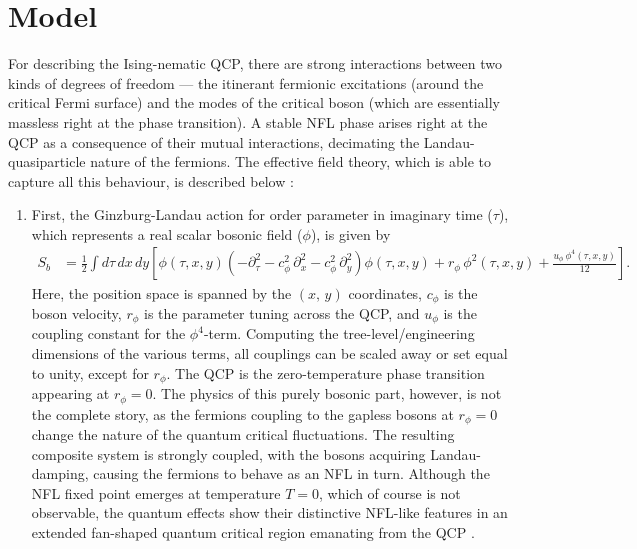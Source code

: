 \documentclass[aps, prb, onecolumn, nofootinbib, citeautoscript, 10pt]{revtex4-2}
\begin{document}
\section{Model}
\label{secmodel}

For describing the Ising-nematic QCP, there are strong interactions between two kinds of degrees of freedom --- the itinerant fermionic excitations (around the critical Fermi surface) and the modes of the critical boson (which are essentially massless right at the phase transition). A stable NFL phase arises right at the QCP as a consequence of their mutual interactions, decimating the Landau-quasiparticle nature of the fermions. The effective field theory, which is able to capture all this behaviour, is described below \cite{metlsach1,sachdev_2011}:
\begin{enumerate}[leftmargin=*]

\item First, the Ginzburg-Landau action for order parameter in imaginary time ($\tau$), which represents a real scalar bosonic field ($ \phi $), is given by
\begin{align}
	\label{ac1}
	S_b & =  \frac{1}{2} \int d\tau \,dx \, dy\left[  \phi(\tau,x,y)
	\left(- \partial_\tau ^2 -  c_\phi ^2 \, \partial_x ^2 -  c_\phi ^2 \, \partial_y ^2
	\right) \phi (\tau,x,y)
	+  r_\phi \,\phi^2 (\tau,x,y)
	+  \frac{u_\phi \,\phi^ 4(\tau,x,y) } {12}
	\right].
\end{align}
Here, the position space is spanned by the $(x,\,y)$ coordinates, $c_\phi$ is the boson velocity, $ r_\phi$ is the parameter tuning across the QCP, and $u_\phi$ is the coupling constant for the $\phi^4$-term. Computing the tree-level/engineering dimensions of the various terms, all couplings can be scaled away or set equal to unity, except for $r_\phi$. 
The QCP is the zero-temperature phase transition appearing at $ r_\phi =0$. The physics of this purely bosonic part, however, is not the complete story, as the fermions coupling to the gapless bosons at $ r_\phi =0$ change the nature of the quantum critical fluctuations. The resulting composite system is strongly coupled, with the bosons acquiring Landau-damping, causing the fermions to behave as an NFL in turn. Although the NFL fixed point emerges at temperature $T=0$, which of course is not observable, the quantum effects show their distinctive NFL-like features  in an extended fan-shaped quantum critical region emanating from the QCP \cite{sachdev_2011}.
	
		
		

\end{enumerate}
\end{document}
